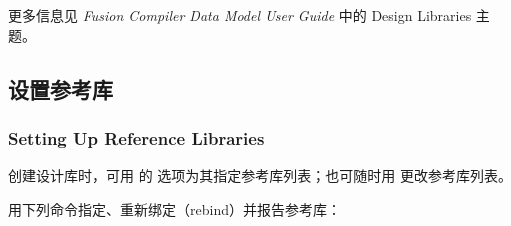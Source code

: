 \begin{seeAlsoBox}
更多信息见 \textit{Fusion Compiler Data Model User Guide} 中的 Design Libraries 主题。
\end{seeAlsoBox}

\subsection{设置参考库}
\subsubsection*{Setting Up Reference Libraries}

创建设计库时，可用  的  选项为其指定参考库列表；也可随时用  更改参考库列表。

用下列命令指定、重新绑定（rebind）并报告参考库：
